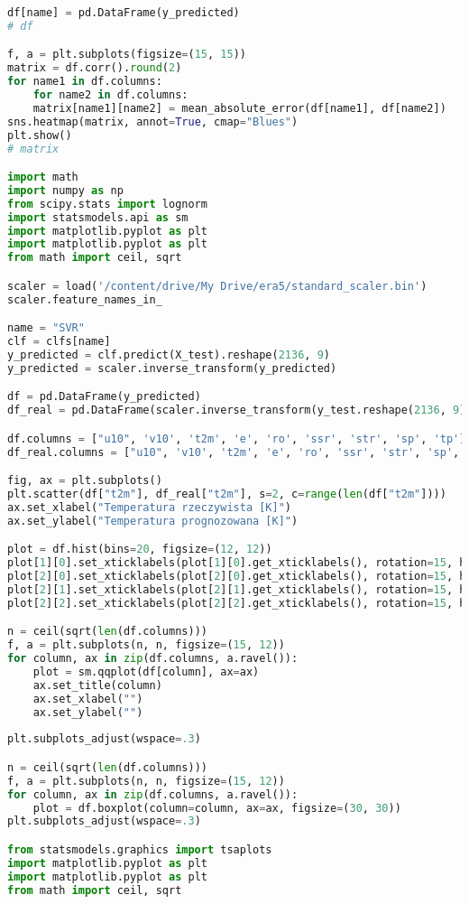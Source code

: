 \begin{lstlisting}[label=python-listing,caption={Kod źródłowy},language=python]
    df[name] = pd.DataFrame(y_predicted)
# df

f, a = plt.subplots(figsize=(15, 15))
matrix = df.corr().round(2)
for name1 in df.columns:
    for name2 in df.columns:
    matrix[name1][name2] = mean_absolute_error(df[name1], df[name2])
sns.heatmap(matrix, annot=True, cmap="Blues")
plt.show()
# matrix

import math
import numpy as np
from scipy.stats import lognorm
import statsmodels.api as sm
import matplotlib.pyplot as plt
import matplotlib.pyplot as plt
from math import ceil, sqrt

scaler = load('/content/drive/My Drive/era5/standard_scaler.bin')
scaler.feature_names_in_

name = "SVR"
clf = clfs[name]
y_predicted = clf.predict(X_test).reshape(2136, 9)
y_predicted = scaler.inverse_transform(y_predicted)

df = pd.DataFrame(y_predicted)
df_real = pd.DataFrame(scaler.inverse_transform(y_test.reshape(2136, 9)))

df.columns = ["u10", 'v10', 't2m', 'e', 'ro', 'ssr', 'str', 'sp', 'tp']
df_real.columns = ["u10", 'v10', 't2m', 'e', 'ro', 'ssr', 'str', 'sp', 'tp']

fig, ax = plt.subplots()
plt.scatter(df["t2m"], df_real["t2m"], s=2, c=range(len(df["t2m"])))
ax.set_xlabel("Temperatura rzeczywista [K]")
ax.set_ylabel("Temperatura prognozowana [K]")

plot = df.hist(bins=20, figsize=(12, 12))
plot[1][0].set_xticklabels(plot[1][0].get_xticklabels(), rotation=15, ha='center')
plot[2][0].set_xticklabels(plot[2][0].get_xticklabels(), rotation=15, ha='center')
plot[2][1].set_xticklabels(plot[2][1].get_xticklabels(), rotation=15, ha='center')
plot[2][2].set_xticklabels(plot[2][2].get_xticklabels(), rotation=15, ha='center')

n = ceil(sqrt(len(df.columns)))
f, a = plt.subplots(n, n, figsize=(15, 12))
for column, ax in zip(df.columns, a.ravel()):
    plot = sm.qqplot(df[column], ax=ax)
    ax.set_title(column)
    ax.set_xlabel("")
    ax.set_ylabel("")
    
plt.subplots_adjust(wspace=.3)

n = ceil(sqrt(len(df.columns)))
f, a = plt.subplots(n, n, figsize=(15, 12))
for column, ax in zip(df.columns, a.ravel()):
    plot = df.boxplot(column=column, ax=ax, figsize=(30, 30))
plt.subplots_adjust(wspace=.3)

from statsmodels.graphics import tsaplots
import matplotlib.pyplot as plt
import matplotlib.pyplot as plt
from math import ceil, sqrt


\end{lstlisting}
